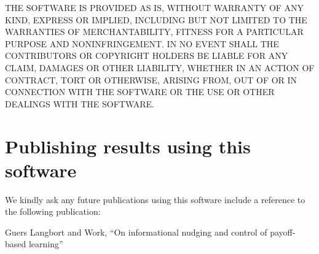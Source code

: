 \documentclass[english]{article}
\begin{document}
THE SOFTWARE IS PROVIDED \textquotedbl{}AS IS\textquotedbl{}, WITHOUT
WARRANTY OF ANY KIND, EXPRESS OR IMPLIED, INCLUDING BUT NOT LIMITED
TO THE WARRANTIES OF MERCHANTABILITY, FITNESS FOR A PARTICULAR PURPOSE
AND NONINFRINGEMENT. IN NO EVENT SHALL THE CONTRIBUTORS OR COPYRIGHT
HOLDERS BE LIABLE FOR ANY CLAIM, DAMAGES OR OTHER LIABILITY, WHETHER
IN AN ACTION OF CONTRACT, TORT OR OTHERWISE, ARISING FROM, OUT OF
OR IN CONNECTION WITH THE SOFTWARE OR THE USE OR OTHER DEALINGS WITH
THE SOFTWARE.


\section{Publishing results using this software}

We kindly ask any future publications using this software include
a reference to the following publication:

Guers Langbort and Work, ``On informational nudging and control of payoff-based learning''
\end{document}
